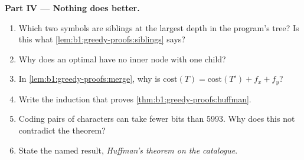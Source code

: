 \begin{problem}
\medskip\noindent\textbf{Part IV --- Nothing does better.}
\begin{enumerate}[resume]
\item Which two symbols are siblings at the largest depth in the program's tree? Is this what
\cref{lem:b1:greedy-proofs:siblings} says?
\item Why does an optimal  have no inner node with one child?
\item In \cref{lem:b1:greedy-proofs:merge}, why is $\mathrm{cost}(T) = \mathrm{cost}(T') + f_x + f_y$?
\item Write the induction that proves \cref{thm:b1:greedy-proofs:huffman}.
\item Coding pairs of characters can take fewer bits than 5993. Why does this not contradict the theorem?
\item State the named result, \emph{Huffman's theorem on the catalogue}.
\end{enumerate}
\end{problem}
